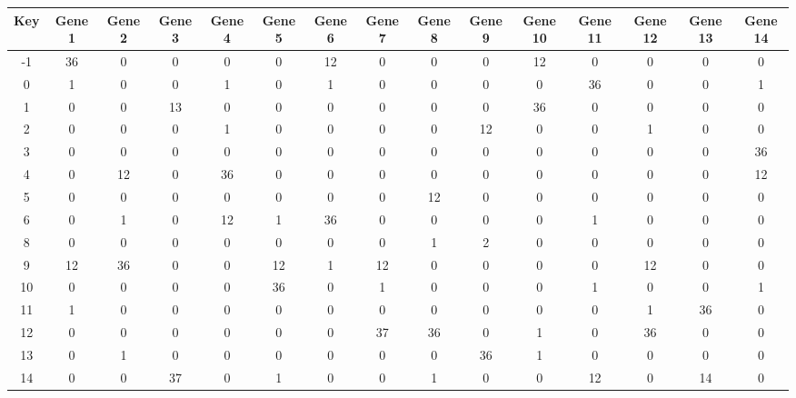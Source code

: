 \begin{tabular}{|c|c|c|c|c|c|c|c|c|c|c|c|c|c|c|}
\hline
Key & Gene 1 & Gene 2 & Gene 3 & Gene 4 & Gene 5 & Gene 6 & Gene 7 & Gene 8 & Gene 9 & Gene 10 & Gene 11 & Gene 12 & Gene 13 & Gene 14 \\
\hline
-1 & 36 & 0 & 0 & 0 & 0 & 12 & 0 & 0 & 0 & 12 & 0 & 0 & 0 & 0 \\
0 & 1 & 0 & 0 & 1 & 0 & 1 & 0 & 0 & 0 & 0 & 36 & 0 & 0 & 1 \\
1 & 0 & 0 & 13 & 0 & 0 & 0 & 0 & 0 & 0 & 36 & 0 & 0 & 0 & 0 \\
2 & 0 & 0 & 0 & 1 & 0 & 0 & 0 & 0 & 12 & 0 & 0 & 1 & 0 & 0 \\
3 & 0 & 0 & 0 & 0 & 0 & 0 & 0 & 0 & 0 & 0 & 0 & 0 & 0 & 36 \\
4 & 0 & 12 & 0 & 36 & 0 & 0 & 0 & 0 & 0 & 0 & 0 & 0 & 0 & 12 \\
5 & 0 & 0 & 0 & 0 & 0 & 0 & 0 & 12 & 0 & 0 & 0 & 0 & 0 & 0 \\
6 & 0 & 1 & 0 & 12 & 1 & 36 & 0 & 0 & 0 & 0 & 1 & 0 & 0 & 0 \\
8 & 0 & 0 & 0 & 0 & 0 & 0 & 0 & 1 & 2 & 0 & 0 & 0 & 0 & 0 \\
9 & 12 & 36 & 0 & 0 & 12 & 1 & 12 & 0 & 0 & 0 & 0 & 12 & 0 & 0 \\
10 & 0 & 0 & 0 & 0 & 36 & 0 & 1 & 0 & 0 & 0 & 1 & 0 & 0 & 1 \\
11 & 1 & 0 & 0 & 0 & 0 & 0 & 0 & 0 & 0 & 0 & 0 & 1 & 36 & 0 \\
12 & 0 & 0 & 0 & 0 & 0 & 0 & 37 & 36 & 0 & 1 & 0 & 36 & 0 & 0 \\
13 & 0 & 1 & 0 & 0 & 0 & 0 & 0 & 0 & 36 & 1 & 0 & 0 & 0 & 0 \\
14 & 0 & 0 & 37 & 0 & 1 & 0 & 0 & 1 & 0 & 0 & 12 & 0 & 14 & 0 \\
\hline
\end{tabular}